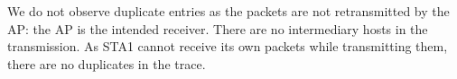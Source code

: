 

We do not observe duplicate entries as the packets are not retransmitted by the AP: the AP is the intended receiver. There are no intermediary hosts in the transmission. As STA1 cannot receive its own packets while transmitting them, there are no duplicates in the trace.
